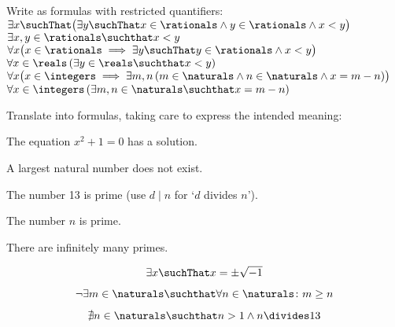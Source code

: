 \begin{ExerciseList}
  Write as formulas with restricted quantifiers:
  \Exercise $\exists{x} \suchThat \bigl( \exists{y} \suchThat x \in \rationals \land y \in \rationals \land x < y \bigr)$
  \Answer $\exists{x,y} \in \rationals \suchthat x < y$
  \Exercise $\forall{x} \bigl( x \in \rationals \implies \exists{y} \suchThat y \in \rationals \land x < y \bigr) $
  \Answer $\forall{x} \in \reals \left( \exists{y} \in \reals \suchthat x < y \right)$
  \Exercise $\forall{x} \bigl( x \in \integers \implies \exists{m,n} \left( m \in \naturals \land n \in \naturals \land x = m - n \right) \bigr)$
  \Answer $\forall{x} \in \integers %
              \left( %
                  \exists{m,n} \in \naturals \suchthat x = m - n %
              \right)$
\end{ExerciseList}

\begin{Exercise} [number=31]
  Translate into formulas, taking care to express the intended meaning:

  \Question The equation $x^2 + 1 = 0$ has a solution.

  \Question A largest natural number does not exist.

  \Question The number 13 is prime (use $d \mid n$ for `$d$ divides $n$').

  \Question The number $n$ is prime.

  \Question There are infinitely many primes.

\end{Exercise}

\begin{Answer} [number=31.1]
\begin{displaymath}
\exists{x} \suchThat x = \pm \sqrt{-1}
\end{displaymath}
\end{Answer}


\begin{Answer} [number=31.2]
\begin{displaymath}
\neg \exists{m \in \naturals} \suchthat \forall{n \in \naturals} \colon m \geq n
\end{displaymath}
\end{Answer}

\begin{Answer}
  \begin{displaymath}
    \nexists{n \in \naturals} \suchthat n > 1 \land n \divides 13
  \end{displaymath}
\end{Answer}


